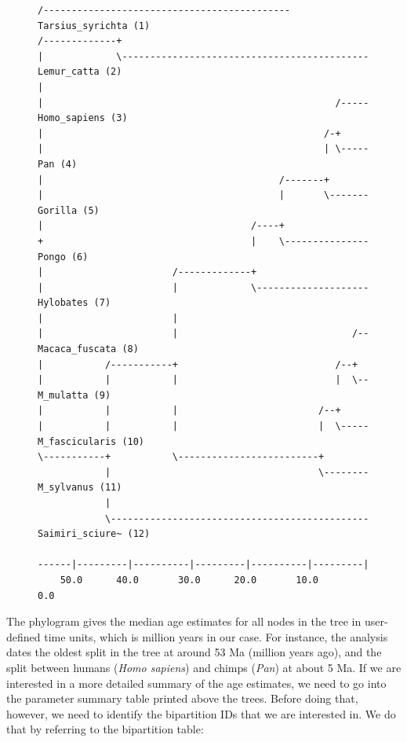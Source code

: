 \documentclass[12pt]{book}
\begin{document}
\begin{figure}[H]
\centering
\begin{BVerbatim}[fontsize=\scriptsize]
              /-------------------------------------------- Tarsius_syrichta (1)
/-------------+
|             \-------------------------------------------- Lemur_catta (2)
|
|                                                    /----- Homo_sapiens (3)
|                                                  /-+
|                                                  | \----- Pan (4)
|                                          /-------+
|                                          |       \------- Gorilla (5)
|                                     /----+
+                                     |    \--------------- Pongo (6)
|                       /-------------+
|                       |             \-------------------- Hylobates (7)
|                       |
|                       |                               /-- Macaca_fuscata (8)
|           /-----------+                            /--+
|           |           |                            |  \-- M_mulatta (9)
|           |           |                         /--+
|           |           |                         |  \----- M_fascicularis (10)
\-----------+           \-------------------------+
            |                                     \-------- M_sylvanus (11)
            |
            \---------------------------------------------- Saimiri_sciure~ (12)

------|---------|----------|---------|----------|---------|
    50.0      40.0       30.0      20.0       10.0       0.0
\end{BVerbatim}
\end{figure}

The phylogram gives the median age estimates for all nodes in the tree in user-defined time units,
which is million years in our case. For instance, the analysis dates the oldest split in the tree
at around 53 Ma (million years ago), and the split between humans (\textit{Homo sapiens}) and
chimps (\textit{Pan}) at about 5 Ma. If we are interested in a more detailed summary of the age
estimates, we need to go into the parameter summary table printed above the trees. Before doing
that, however, we need to identify the bipartition IDs that we are interested in. We do that by
referring to the bipartition table:
\end{document}

